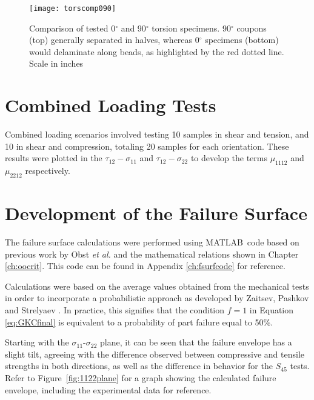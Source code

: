\documentclass[main.tex]{subfiles}
\begin{document}
\begin{figure}[!htbp]
	\center
	\texttt{[image: torscomp090]}
	\captionsetup{justification=centering} %
	\caption[Comparison of tested 0$^\circ$ and 90$^\circ$ torsion specimens]{Comparison of tested 0$^\circ$ and 90$^\circ$ torsion specimens. 90$^\circ$ coupons (top) generally separated in halves, whereas 0$^\circ$ specimens (bottom) would delaminate along beads, as highlighted by the red dotted line. Scale in inches} \label{fig:090ctors}
\end{figure}
   
\section{Combined Loading Tests} \label{sec:clr}

Combined loading scenarios involved testing 10 samples in shear and tension, and 10 in shear and compression, totaling 20 samples for each orientation. These results were plotted in the $\tau_{12}-\sigma_{11}$ and $\tau_{12}-\sigma_{22}$ to develop the terms $\mu_{1112}$ and $\mu_{2212}$ respectively. 
 
\section{Development of the Failure Surface} \label{sec:fsc}

The failure surface calculations were performed using MATLAB\textregistered~code based on previous work by Obst \emph{et al.} \cite{Obst2018} and the mathematical relations shown in Chapter \ref{ch:oocrit}. This code can be found in Appendix \ref{ch:fsurfcode} for reference.

Calculations were based on the average values obtained from the mechanical tests in order to incorporate a probabilistic approach as developed by Zaitsev, Pashkov and Strelyaev \cite{Zaitsev1975}. In practice, this signifies that the condition $f=1$ in Equation \ref{eq:GKCfinal} is equivalent to a probability of part failure equal to 50\%.

Starting with the $\sigma_{11}$-$\sigma_{22}$ plane, it can be seen that the failure envelope has a slight tilt, agreeing with the difference observed between compressive and tensile strengths in both directions, as well as the difference in behavior for the $S_{45}$ tests. Refer to Figure~\ref{fig:1122plane} for a graph showing the calculated failure envelope, including the experimental data for reference.
\end{document}
